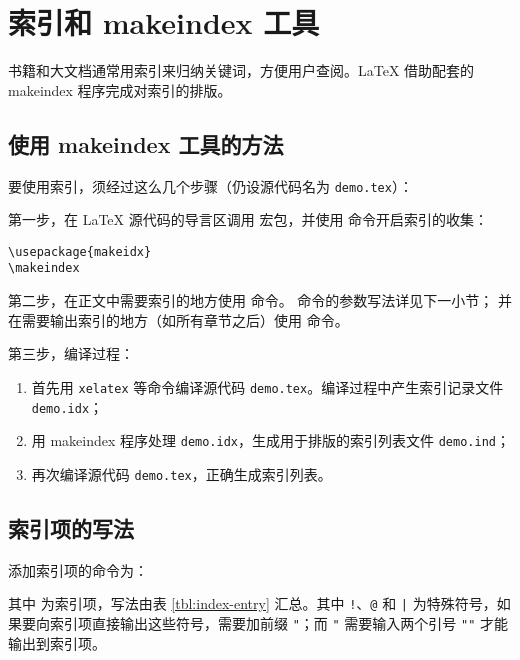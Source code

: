 \section{索引和 makeindex 工具}\label{sec:index}

书籍和大文档通常用索引来归纳关键词，方便用户查阅。\LaTeX{} 借助配套的 makeindex 程序完成对索引的排版。

\subsection{使用 makeindex 工具的方法}\label{subsec:makeidx}

要使用索引，须经过这么几个步骤（仍设源代码名为 \texttt{demo.tex}）：

第一步，在 \LaTeX{} 源代码的导言区调用  宏包，并使用  命令开启索引的收集：
\begin{verbatim}
\usepackage{makeidx}
\makeindex
\end{verbatim}

第二步，在正文中需要索引的地方使用  命令。 命令的参数写法详见下一小节；
并在需要输出索引的地方（如所有章节之后）使用  命令。

第三步，编译过程：

\begin{enumerate}
  \item 首先用 \texttt{xelatex} 等命令编译源代码 \texttt{demo.tex}。编译过程中产生索引记录文件 \texttt{demo.idx}；
  \item 用 makeindex 程序处理 \texttt{demo.idx}，生成用于排版的索引列表文件 \texttt{demo.ind}；
  \item 再次编译源代码 \texttt{demo.tex}，正确生成索引列表。
\end{enumerate}

\subsection{索引项的写法}\label{subsec:index-entry}

添加索引项的命令为：
\begin{command}
\end{command}

其中  为索引项，写法由表 \ref{tbl:index-entry} 汇总。其中 \texttt!、\texttt @ 和 \texttt|
为特殊符号，如果要向索引项直接输出这些符号，需要加前缀 \texttt"；而 \texttt" 需要输入两个引号 \texttt{""} 才能输出到索引项。

